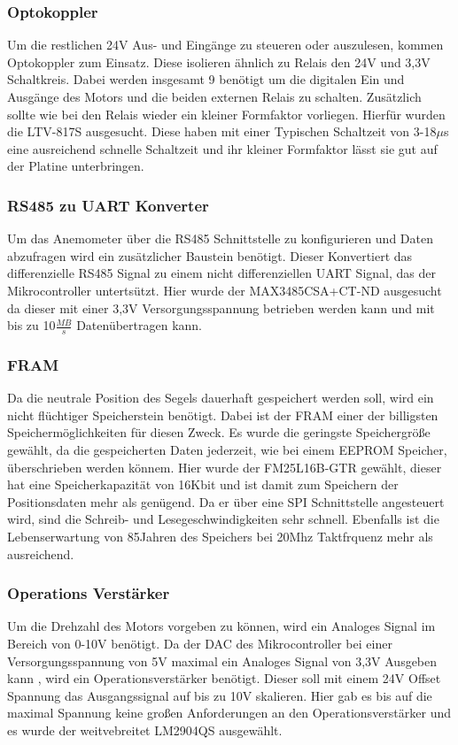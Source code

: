 \subsubsection{Optokoppler}
Um die restlichen 24V Aus- und Eingänge zu steueren oder auszulesen, kommen Optokoppler zum Einsatz. Diese isolieren ähnlich zu Relais den 24V und 3,3V Schaltkreis. Dabei werden insgesamt 9 benötigt um die digitalen Ein und Ausgänge des Motors und die beiden externen Relais zu schalten. Zusätzlich sollte wie bei den Relais wieder ein kleiner Formfaktor vorliegen. Hierfür wurden die LTV-817S ausgesucht. Diese haben mit einer Typischen Schaltzeit von 3-18$\mu$s eine ausreichend schnelle Schaltzeit und ihr kleiner Formfaktor lässt sie gut auf der Platine unterbringen.
\subsubsection{RS485 zu UART Konverter}
Um das Anemometer über die RS485 Schnittstelle zu konfigurieren und Daten abzufragen wird ein zusätzlicher Baustein benötigt. Dieser Konvertiert das differenzielle RS485 Signal zu einem nicht differenziellen \ac{UART} Signal, das der Mikrocontroller untertsützt. Hier wurde der MAX3485CSA+CT-ND ausgesucht da dieser mit einer 3,3V Versorgungsspannung betrieben werden kann und mit bis zu 10$\frac{MB}{s}$ Datenübertragen kann.
\subsubsection{FRAM}
Da die neutrale Position des Segels dauerhaft gespeichert werden soll, wird ein nicht flüchtiger Speicherstein benötigt. Dabei ist der \ac{FRAM} einer der billigsten Speichermöglichkeiten für diesen Zweck. Es wurde die geringste Speichergröße gewählt, da die gespeicherten Daten jederzeit, wie bei einem EEPROM Speicher, überschrieben werden könnem. Hier wurde der FM25L16B-GTR gewählt, dieser hat eine Speicherkapazität von 16Kbit und ist damit zum Speichern der Positionsdaten mehr als genügend. Da er über eine \ac{SPI} Schnittstelle angesteuert wird, sind die Schreib- und Lesegeschwindigkeiten sehr schnell. Ebenfalls ist die Lebenserwartung von 85Jahren des Speichers bei 20Mhz Taktfrquenz mehr als ausreichend.
\subsubsection{Operations Verstärker}
Um die Drehzahl des Motors vorgeben zu können, wird ein Analoges Signal im Bereich von 0-10V benötigt. Da der \ac{DAC} des Mikrocontroller bei einer Versorgungsspannung von 5V maximal ein Analoges Signal von 3,3V Ausgeben kann \cite{STM32}, wird ein Operationsverstärker benötigt. Dieser soll mit einem 24V Offset Spannung das Ausgangssignal auf bis zu 10V skalieren. Hier gab es bis auf die maximal Spannung keine großen Anforderungen an den Operationsverstärker und es wurde der weitvebreitet LM2904QS ausgewählt.
